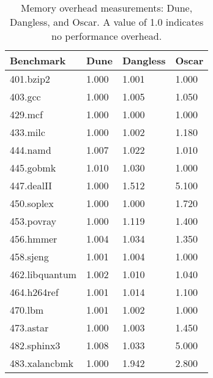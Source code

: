 \begin{table}[]
	\centering
	\begin{tabular}{|l|l|l|l|}
		\hline
		\textbf{Benchmark} & \textbf{Dune} & \textbf{Dangless} & \textbf{Oscar} \\ \hline
		401.bzip2          & 1.000         & 1.001             & 1.000          \\ \hline
		403.gcc            & 1.000         & 1.005             & 1.050          \\ \hline
		429.mcf            & 1.000         & 1.000             & 1.000          \\ \hline
		433.milc           & 1.000         & 1.002             & 1.180          \\ \hline
		444.namd           & 1.007         & 1.022             & 1.010          \\ \hline
		445.gobmk          & 1.010         & 1.030             & 1.000          \\ \hline
		447.dealII         & 1.000         & 1.512             & 5.100          \\ \hline
		450.soplex         & 1.000         & 1.000             & 1.720          \\ \hline
		453.povray         & 1.000         & 1.119             & 1.400          \\ \hline
		456.hmmer          & 1.004         & 1.034             & 1.350          \\ \hline
		458.sjeng          & 1.001         & 1.004             & 1.000          \\ \hline
		462.libquantum     & 1.002         & 1.010             & 1.040          \\ \hline
		464.h264ref        & 1.001         & 1.014             & 1.100          \\ \hline
		470.lbm            & 1.001         & 1.002             & 1.000          \\ \hline
		473.astar          & 1.000         & 1.003             & 1.450          \\ \hline
		482.sphinx3        & 1.008         & 1.033             & 5.000          \\ \hline
		483.xalancbmk      & 1.000         & 1.942             & 2.800          \\ \hline
	\end{tabular}
	\caption{Memory overhead measurements: Dune, Dangless, and Oscar. A value of 1.0 indicates no performance overhead.}
	\label{tab:mem-dune-dangless-oscar}
\end{table}

